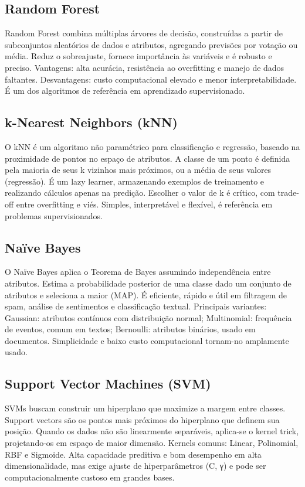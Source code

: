 \documentclass[english, spanish, brazilian]{RBIEarticle} %
\begin{document}
\subsection{Random Forest}
Random Forest combina múltiplas árvores de decisão, construídas a partir de subconjuntos aleatórios de dados e atributos, agregando previsões por votação ou média. Reduz o sobreajuste, fornece importância às variáveis e é robusto e preciso. Vantagens: alta acurácia, resistência ao overfitting e manejo de dados faltantes. Desvantagens: custo computacional elevado e menor interpretabilidade. É um dos algoritmos de referência em aprendizado supervisionado.

\subsection{k-Nearest Neighbors (kNN)}
O kNN é um algoritmo não paramétrico para classificação e regressão, baseado na proximidade de pontos no espaço de atributos. A classe de um ponto é definida pela maioria de seus k vizinhos mais próximos, ou a média de seus valores (regressão). É um lazy learner, armazenando exemplos de treinamento e realizando cálculos apenas na predição. Escolher o valor de k é crítico, com trade-off entre overfitting e viés. Simples, interpretável e flexível, é referência em problemas supervisionados.

\subsection{Naïve Bayes}
O Naïve Bayes aplica o Teorema de Bayes assumindo independência entre atributos. Estima a probabilidade posterior de uma classe dado um conjunto de atributos e seleciona a maior (MAP). É eficiente, rápido e útil em filtragem de spam, análise de sentimentos e classificação textual. Principais variantes: Gaussian: atributos contínuos com distribuição normal; Multinomial: frequência de eventos, comum em textos; Bernoulli: atributos binários, usado em documentos.
 Simplicidade e baixo custo computacional tornam-no amplamente usado.

\subsection{Support Vector Machines (SVM)}
SVMs buscam construir um hiperplano que maximize a margem entre classes. Support vectors são os pontos mais próximos do hiperplano que definem sua posição. Quando os dados não são linearmente separáveis, aplica-se o kernel trick, projetando-os em espaço de maior dimensão. Kernels comuns: Linear, Polinomial, RBF e Sigmoide. Alta capacidade preditiva e bom desempenho em alta dimensionalidade, mas exige ajuste de hiperparâmetros (C, γ) e pode ser computacionalmente custoso em grandes bases.
\end{document}

